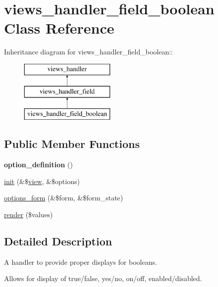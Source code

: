 \hypertarget{classviews__handler__field__boolean}{
\section{views\_\-handler\_\-field\_\-boolean Class Reference}
\label{classviews__handler__field__boolean}
}
Inheritance diagram for views\_\-handler\_\-field\_\-boolean::\begin{figure}[H]
\begin{center}
\leavevmode
\includegraphics[height=3cm]{classviews__handler__field__boolean}
\end{center}
\end{figure}
\subsection*{Public Member Functions}
\begin{DoxyCompactItemize}
\item 
\hypertarget{classviews__handler__field__boolean_a53f8c9215cddcfb3cab33f742a1e6c52}{
{\bfseries option\_\-definition} ()}
\label{classviews__handler__field__boolean_a53f8c9215cddcfb3cab33f742a1e6c52}

\item 
\hyperlink{classviews__handler__field__boolean_aaf7acd5dcd7831d32a3977f5211230fb}{init} (\&\$\hyperlink{classview}{view}, \&\$options)
\item 
\hyperlink{classviews__handler__field__boolean_a3addce6b85348a630627f348907082e3}{options\_\-form} (\&\$form, \&\$form\_\-state)
\item 
\hyperlink{classviews__handler__field__boolean_ad7d7fc1b29362cee6b2f043e029052af}{render} (\$values)
\end{DoxyCompactItemize}


\subsection{Detailed Description}
A handler to provide proper displays for booleans.

Allows for display of true/false, yes/no, on/off, enabled/disabled.

